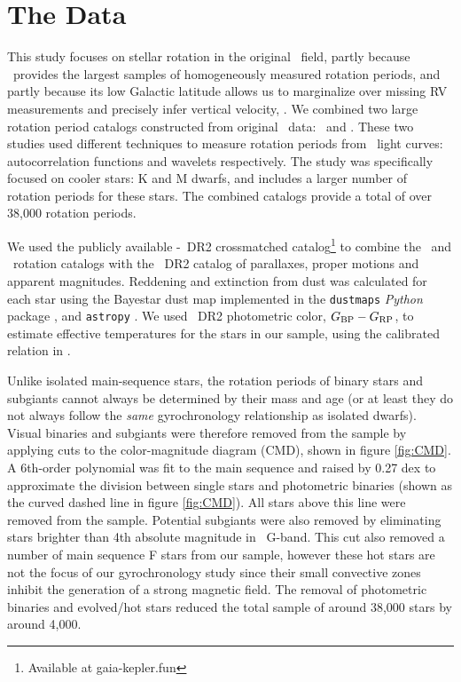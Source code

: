 \section{The Data}
\label{sec:data}

This study focuses on stellar rotation in the original \kepler\ field, partly
because \kepler\ provides the largest samples of homogeneously measured
rotation periods, and partly because its low Galactic latitude allows us to
marginalize over missing RV measurements and precisely infer vertical
velocity, \vz.
We combined two large rotation period catalogs constructed from original
\kepler\ data: \mct\ and \sant.
These two studies used different techniques to measure rotation periods from
\kepler\ light curves: autocorrelation functions and wavelets respectively.
The \citet{santos2019} study was specifically focused on cooler stars: K and M
dwarfs, and includes a larger number of rotation periods for these stars.
The combined catalogs provide a total of over 38,000 rotation periods.

We used the publicly available \kepler-\gaia\ DR2 crossmatched
catalog\footnote{Available at gaia-kepler.fun} to combine the \mct\ and \sant\
rotation catalogs with the \gaia\ DR2 catalog of parallaxes, proper motions
and apparent magnitudes.
Reddening and extinction from dust was calculated for each star using the
Bayestar dust map implemented in the {\tt dustmaps} {\it Python} package
\citep{green2018}, and {\tt astropy} \citep{astropy2013, astropy2018}.
We used \gaia\ DR2 photometric color, $G_{\rm BP} - G_{\rm RP}$, to estimate
effective temperatures for the stars in our sample, using the calibrated
relation in \citet{curtis2020}.

Unlike isolated main-sequence stars, the rotation periods of binary stars and
subgiants cannot always be determined by their mass and age (or at least they
do not always follow the {\it same} gyrochronology relationship as isolated
dwarfs).
Visual binaries and subgiants were therefore removed from the sample by
applying cuts to the color-magnitude diagram (CMD), shown in figure
\ref{fig:CMD}.
A 6th-order polynomial was fit to the main sequence and raised by 0.27 dex to
approximate the division between single stars and photometric binaries (shown
as the curved dashed line in figure \ref{fig:CMD}).
All stars above this line were removed from the sample.
Potential subgiants were also removed by eliminating stars brighter than 4th
absolute magnitude in \gaia\ G-band.
This cut also removed a number of main sequence F stars from our sample,
however these hot stars are not the focus of our gyrochronology study since
their small convective zones inhibit the generation of a strong magnetic
field.
The removal of photometric binaries and evolved/hot stars reduced the total
sample of around 38,000 stars by around 4,000.

